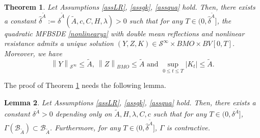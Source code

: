 \documentclass[10pt]{article}%
\numberwithin{equation}{section}
\newtheorem{theorem}{Theorem}[section]
\newtheorem{lemma}[theorem]{Lemma}
\begin{document}
	\begin{theorem}\label{thmbddterminal}
	  Let Assumptions \ref{assLR}, \ref{assgk}, \ref{assqua} hold. Then, there exists a constant $\hat{\delta}^{\tilde{A}}:=\hat{\delta}^{\tilde{A}}(\tilde{A}, c, C, H, \lambda)>0$ such that for any $T\in(0,\hat{\delta}^{\tilde{A}}]$, the quadratic MFBSDE \eqref{nonlinearyz} with double mean reflections and nonlinear resistance  admits a unique solution $(Y, Z, K) \in \mathcal{S}^{\infty} \times BMO \times BV[0,T]$. Moreover, we have  
     $$\left \| Y \right \|_{\mathcal{S}^{\infty}}\leq \tilde{A}, \  \left \| Z \right \|_{BMO}\leq \tilde{A} \text{ and } \sup_{0 \leq t \leq T}\left|K_t\right|\leq \tilde{A}.$$
	\end{theorem}

The proof of Theorem \ref{thmbddterminal} needs the following lemma. %
\begin{lemma}\label{4.1.1}
Let Assumptions \ref{assLR}, \ref{assgk}, \ref{assqua} hold. Then, there exists a constant $\delta^{\tilde{A}}>0$ depending only on $\tilde{A}, H, \lambda, C, c$ such that for any $T\in(0,\delta^{\tilde{A}}]$, $\Gamma(\mathscr{B}_{\tilde{A}})\subset \mathscr{B}_{\tilde{A}}$. Furthermore, for any $T\in(0,\hat{\delta}^{\tilde{A
}}]$, $\Gamma$ is contractive.
\end{lemma}
\end{document}
